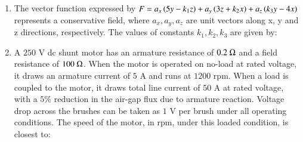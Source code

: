 \documentclass[journal,12pt,onecolumn]{IEEEtran}
\theoremstyle{remark}
\begin{document}
\begin{enumerate}[start=1, label=Q.\arabic*]
    \hfill{}

    \item The vector function expressed by $F=a_{x}\left(5y-k_{1}z\right)+a_{y}\left(3z+k_{2}x\right)+a_{z}\left(k_{3}y-4x\right)$ represents a conservative field, where $a_{x}, a_{y}, a_{z}$ are unit vectors along x, y and z directions, respectively. The values of constants $k_{1}, k_{2}, k_{3}$ are given by:
    \begin{enumerate}
    \end{enumerate}

    \hfill{}

    \item A $250$ V dc shunt motor has an armature resistance of $0.2~\ohm$ and a field resistance of $100~\ohm$. When the motor is operated on no-load at rated voltage, it draws an armature current of $5$ A and runs at $1200$ rpm. When a load is coupled to the motor, it draws total line current of $50$ A at rated voltage, with a $5\%$ reduction in the air-gap flux due to armature reaction. Voltage drop across the brushes can be taken as $1$ V per brush under all operating conditions. The speed of the motor, in rpm, under this loaded condition, is closest to:
    \begin{enumerate}
    \end{enumerate}


\end{enumerate}
\end{document}
